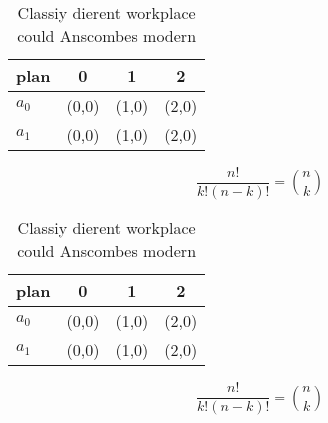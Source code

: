 \documentclass[a4paper]{article}
\begin{document}
\begin{table}
\begin{adjustbox}{width=0.6\columnwidth}
\begin{tabular}{|l|l|l|l|}
\hline
\textbf{plan} & \multicolumn{1}{c|}{\textbf{0}} & \multicolumn{1}{c|}{\textbf{1}} & \multicolumn{1}{c|}{\textbf{2}} \\ \hline
\textbf{$a_0$}  & (0,0) & (1,0) & (2,0) \\ \hline
\textbf{$a_1$}  & (0,0) & (1,0) & (2,0) \\ \hline
\end{tabular}
\end{adjustbox}
\caption{Classiy dierent workplace could Anscombes modern 
}
\end{table}

\[ \frac{n!}{k!(n-k)!} = \binom{n}{k} \]

\begin{table}
\begin{adjustbox}{width=0.6\columnwidth}
\begin{tabular}{|l|l|l|l|}
\hline
\textbf{plan} & \multicolumn{1}{c|}{\textbf{0}} & \multicolumn{1}{c|}{\textbf{1}} & \multicolumn{1}{c|}{\textbf{2}} \\ \hline
\textbf{$a_0$}  & (0,0) & (1,0) & (2,0) \\ \hline
\textbf{$a_1$}  & (0,0) & (1,0) & (2,0) \\ \hline
\end{tabular}
\end{adjustbox}
\caption{Classiy dierent workplace could Anscombes modern 
}
\end{table}

\[ \frac{n!}{k!(n-k)!} = \binom{n}{k} \]
\end{document}
